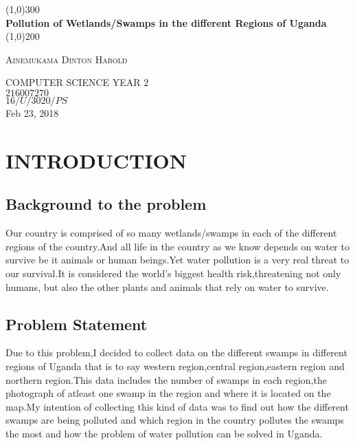 \documentclass{article}
\begin{document}
\begin{titlepage}
	\begin{center}
	\line(1,0){300}\\
	[0.25in]
	\huge{\bfseries Pollution of Wetlands/Swamps in the different Regions of Uganda}\\
	[2mm]
	\line(1,0){200}\\
	\end{center}
\begin{flushright}
\textsc{\large Ainemukama Dinton Harold}
 
 COMPUTER SCIENCE YEAR $2$\\
$216007270$\\
$16/U/3020/PS$\\
Feb 23, 2018\\
\end{flushright}
	
\end{titlepage}
\tableofcontents
\thispagestyle{empty}
\cleardoublepage

\setcounter{page}{1}
\section{INTRODUCTION}
\subsection{Background to the problem}
Our country is comprised of so many wetlands/swamps in each of the different regions of the country.And all life in the country as we know depends on water to survive be it animals or human beings.Yet water pollution is a very real threat to our survival.It is considered the world's biggest health risk,threatening not only humans, but also the other plants and animals that rely on water to survive.
\subsection{Problem Statement}
Due to this problem,I decided to collect data on the different swamps in different regions of Uganda that is to say western region,central region,eastern region and northern region.This data includes the number of swamps in each region,the photograph of atleast one swamp in the region and where it is located on the map.My intention of collecting this kind of data was to find out how the different swamps are being polluted and which region in the country pollutes the swamps the most and how the problem of water pollution can be solved in Uganda.
\end{document}
